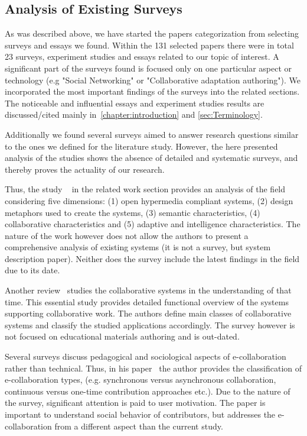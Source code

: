 \documentclass[ngerman,UKenglish,table]{scrbook}
\begin{document}
\subsection{Analysis of Existing Surveys}
\label{sec:existing_surveys}

As was described above, we have started the papers categorization from selecting surveys and essays we found.
Within the 131 selected papers there were in total 23 surveys, experiment studies and essays related to our topic of interest. 
A significant part of the surveys found is focused only on one particular aspect or technology (e.g "Social Networking" or "Collaborative adaptation authoring").
We incorporated the most important findings of the surveys into the related sections.
The noticeable and influential essays and experiment studies results are discussed/cited mainly in~\autoref{chapter:introduction} and \autoref{sec:Terminology}.

Additionally we found several surveys aimed to answer research questions similar to the ones we defined for the literature study.
However, the here presented analysis of the studies shows the absence of detailed and systematic surveys, and thereby proves the actuality of our research.  

Thus, the study ~\cite{garcia2005educational} in the related work section provides an analysis of the field considering five dimensions: (1) open hypermedia compliant systems, (2) design metaphors used to create the systems, (3) semantic characteristics, (4) collaborative characteristics and (5) adaptive and intelligence characteristics.
The nature of the work however does not allow the authors to present a comprehensive analysis of existing systems (it is not a survey, but system description paper).
Neither does the survey include the latest findings in the field due to its date.

Another review~\cite{Bafoutsou2002} studies the collaborative systems in the understanding of that time. 
This essential study provides detailed functional overview of the systems supporting collaborative work.
The authors define main classes of collaborative systems and classify the studied applications accordingly.
The survey however is not focused on educational materials authoring and is out-dated. 

Several surveys \cite{blau2013collaboration, Strobel2008} discuss pedagogical and sociological aspects of e-collaboration rather than technical.
Thus, in his paper~\cite{blau2013collaboration} the author provides the classification of e-collaboration types, (e.g. synchronous versus asynchronous collaboration, continuous versus one-time contribution approaches etc.).
Due to the nature of the survey, significant attention is paid to user motivation.
The paper is important to understand social behavior of contributors, but addresses the e-collaboration from a different aspect than the current study.
\end{document}
